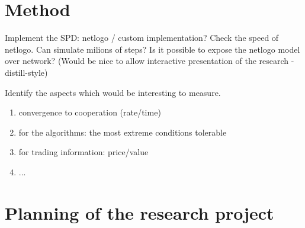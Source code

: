 \documentclass[english]{article}
\begin{document}
\section*{Method}

Implement the SPD: netlogo / custom implementation?
Check the speed of netlogo. Can simulate milions of steps?
Is it possible to expose the netlogo model over network? (Would be nice to allow interactive presentation of the research - distill-style)

Identify the aspects which would be interesting to measure.
\begin{enumerate}
\item convergence to cooperation (rate/time)
\item for the algorithms: the most extreme conditions tolerable
\item for trading information: price/value
\item ...
\end{enumerate}



\section*{Planning of the research project}
\end{document}
